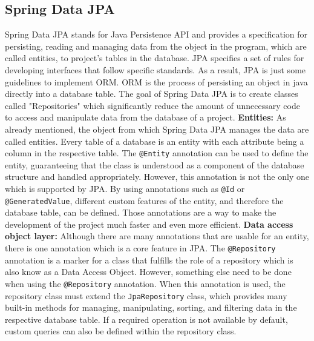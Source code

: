     \subsection{Spring Data JPA}
    Spring Data JPA stands for Java Persistence API and provides a specification for persisting, reading and managing data from the object in the program, which are called entities, to project's tables in the database. JPA specifies a set of rules for developing interfaces that follow specific standards. As a result, JPA is just some guidelines to implement ORM.
    ORM is the process of persisting an object in java directly into a database table. \newline
    The goal of Spring Data JPA is to create classes called "Repositories" which significantly reduce the amount of unnecessary code to access and manipulate data from the database of a project. \newline \newline
    \textbf{Entities:} \newline
    As already mentioned, the object from which Spring Data JPA manages the data are called entities. Every table of a database is an entity with each attribute being a column in the respective table. The \texttt{@Entity} annotation can be used to define the entity, guaranteeing that the class is understood as a component of the database structure and handled appropriately. However, this annotation is not the only one which is supported by JPA. By using annotations such as \texttt{@Id} or \texttt{@GeneratedValue}, different custom features of the entity, and therefore the database table, can be defined. Those annotations are a way to make the development of the project much faster and even more efficient. \newline \newline
    \textbf{Data access object layer:} \newline
    Although there are many annotations that are usable for an entity, there is one annotation which is a core feature in JPA. The \texttt{@Repository} annotation is a marker for a class that fulfills the role of a repository which is also know as a Data Access Object. However, something else need to be done when using the \texttt{@Repository} annotation.
    When this annotation is used, the repository class must extend the \texttt{JpaRepository} class, which provides many built-in methods for managing, manipulating, sorting, and filtering data in the respective database table. If a required operation is not available by default, custom queries can also be defined within the repository class. \newline \newline
